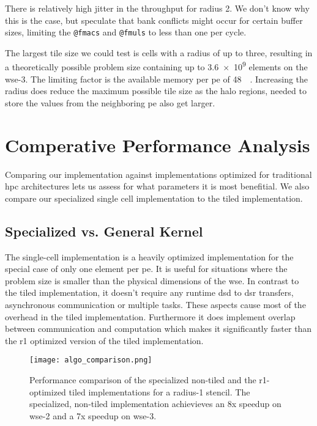 There is relatively high jitter in the throughput for radius 2. We don't know why this is the case, but speculate that bank conflicts might occur for certain buffer sizes, limiting the \texttt{@fmacs} and \texttt{@fmuls} to less than one per cycle.

The largest tile size we could test is  cells with a radius of up to three, resulting in a theoretically possible problem size containing up to \num{3.6e9} elements on the \ac{wse}-3. The limiting factor is the available memory per \ac{pe} of \qty{48}{\kilo\byte}. Increasing the radius does reduce the maximum possible tile size as the halo regions, needed to store the values from the neighboring \ac{pe} also get larger.



\section{Comperative Performance Analysis}
Comparing our implementation against implementations optimized for traditional \ac{hpc} architectures lets us assess for what parameters it is most benefitial. We also compare our specialized single cell implementation to the tiled implementation.  

\subsection{Specialized vs. General Kernel}
The single-cell implementation is a heavily optimized implementation for the special case of only one element per \ac{pe}. It is useful for situations where the problem size is smaller than the physical dimensions of the \ac{wse}. In contrast to the tiled implementation, it doesn't require any runtime \ac{dsd} to \ac{dsr} transfers, asynchronous communication or multiple tasks. These aspects cause most of the overhead in the tiled implementation. Furthermore it does implement overlap between communication and computation which makes it significantly faster than the r1 optimized version of the tiled implementation.
\begin{figure}[h]
    \centering
    \texttt{[image: algo\_comparison.png]}
    \caption{Performance comparison of the specialized non-tiled and the r1-optimized tiled implementations for a radius-1 stencil. The specialized, non-tiled implementation achievieves an 8x speedup on \ac{wse}-2 and a 7x speedup on \ac{wse}-3.}
    \label{fig:algo_comparison}
\end{figure}

